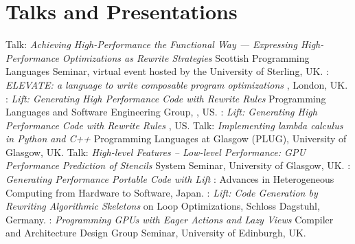 \section{Talks and Presentations}
  {Talk: \emph{Achieving High-Performance the Functional Way — Expressing High-Performance Optimizations as Rewrite Strategies}\newline
  \small Scottish Programming Languages Seminar, virtual event hosted by the University of Sterling, UK.}
  {: \emph{ ELEVATE: a language to write composable program optimizations}\newline
  \small {}, London, UK.}
  {: \emph{Lift: Generating High Performance Code with Rewrite Rules}\newline
  \small Programming Languages and Software Engineering Group, , US.}
  {: \emph{Lift: Generating High Performance Code with Rewrite Rules}\newline
    \small {}, US.}
         {Talk: \emph{Implementing lambda calculus in Python and C++}\newline
          \small Programming Languages at Glasgow (PLUG), University of Glasgow, UK.}
         {Talk: \emph{High-level Features – Low-level Performance: GPU Performance Prediction of Stencils}\newline
          \small System Seminar, University of Glasgow, UK.}
         {:
          \emph{Generating Performance Portable Code with Lift}\newline
         \small {}: Advances in Heterogeneous Computing from Hardware to Software, Japan.}
         {:
          \emph{Lift: Code Generation by Rewriting Algorithmic Skeletons}\newline
         \small {} on Loop Optimizations, Schloss Dagstuhl, Germany.}
         {:
          \emph{Programming GPUs with Eager Actions and Lazy Views}\newline
         \small Compiler and Architecture Design Group Seminar, University of Edinburgh, UK.}
